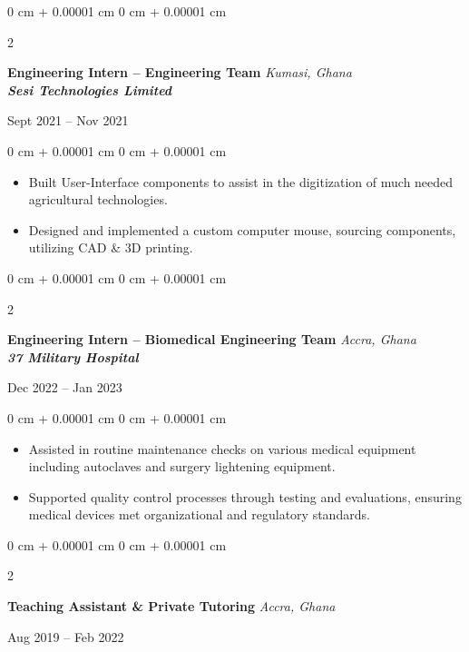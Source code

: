 \documentclass[10pt, letterpaper]{article}
\newenvironment{highlights}{
    \begin{itemize}[
        topsep=0.10 cm,
        parsep=0.10 cm,
        partopsep=0pt,
        itemsep=0pt,
        leftmargin=0 cm + 10pt
    ]
}{
    \end{itemize}
} %
\newenvironment{onecolentry}{
    \begin{adjustwidth}{
        0 cm + 0.00001 cm
    }{
        0 cm + 0.00001 cm
    }
}{
    \end{adjustwidth}
} %
\newenvironment{twocolentry}[2][]{
    \onecolentry
    \def\secondColumn{#2}
    \setcolumnwidth{\fill, 4.5 cm}
    \begin{paracol}{2}
}{
    \switchcolumn \raggedleft \secondColumn
    \end{paracol}
    \endonecolentry
} %
\begin{document}
    \begin{twocolentry}{
        Sept 2021 – Nov 2021
    }
        \textbf{Engineering Intern – Engineering Team} \hfill \textit{Kumasi, Ghana}\\
        \textbf{\textit{Sesi Technologies Limited}}
    \end{twocolentry}

    \vspace{0.10 cm}
    \begin{onecolentry}
        \begin{highlights}
            \item Built User-Interface components to assist in the digitization of much needed agricultural technologies.
            \item Designed and implemented a custom computer mouse, sourcing components, utilizing CAD \& 3D printing.
        \end{highlights}
    \end{onecolentry}

    \vspace{0.2 cm}

    \begin{twocolentry}{
        Dec 2022 – Jan 2023
    }
        \textbf{Engineering Intern – Biomedical Engineering Team} \hfill \textit{Accra, Ghana}\\
        \textbf{\textit{37 Military Hospital}}
    \end{twocolentry}

    \vspace{0.10 cm}
    \begin{onecolentry}
        \begin{highlights}
            \item Assisted in routine maintenance checks on various medical equipment including autoclaves and surgery lightening equipment.
            \item Supported quality control processes through testing and evaluations, ensuring medical devices met organizational and regulatory standards.
        \end{highlights}
    \end{onecolentry}

    \vspace{0.2 cm}

    \begin{twocolentry}{
        Aug 2019 – Feb 2022
    }
        \textbf{Teaching Assistant \& Private Tutoring} \hfill \textit{Accra, Ghana}
    \end{twocolentry}
\end{document}
